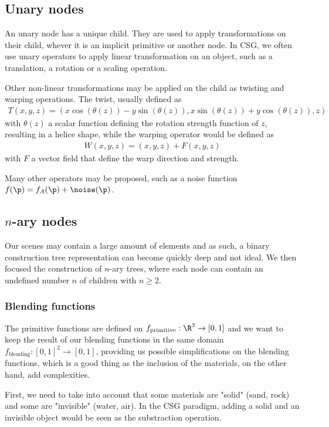 \subsection{Unary nodes}
An unary node has a unique child. They are used to apply transformations on their child, whever it is an implicit primitive or another node. In CSG, we often use unary operators to apply linear transformation on an object, such as a translation, a rotation or a scaling operation. 

Other non-linear transformations may be applied on the child as twisting and warping operations. The twist, usually defined as 
\begin{align}
    T(x, y, z) = \left( x \cos(\theta(z)) - y \sin(\theta(z)), x \sin(\theta(z)) + y \cos(\theta(z)), z \right)
\end{align}
with $\theta(z)$ a scalar function defining the rotation strength function of $z$, resulting in a helice shape, while the warping operator would be defined as 
\begin{align}
    W(x,y,z) = (x,y,z) + F(x, y, z)
\end{align}
with $F$ a vector field that define the warp direction and strength.
    

Many other operators may be proposed, such as a noise function $f(\p) = f_A(\p) + \noise(\p)$.

\subsection{$n$-ary nodes}
Our scenes may contain a large amount of elements and as such, a binary construction tree representation can become quickly deep and not ideal. We then focused the construction of $n$-ary trees, where each node can contain an undefined number $n$ of children with $n \geq 2$.

\subsubsection{Blending functions}
The primitive functions are defined on $f_{\text{primitive}}: \R^3 \to [0,1]$ and we want to keep the result of our blending functions in the same domain $f_{\text{blending}}: [0,1]^2 \to [0,1]$, providing us possible simplifications on the blending functions, which is a good thing as the inclusion of the materials, on the other hand, add complexities.

First, we need to take into account that some materials are "solid" (sand, rock) and some are "invisible" (water, air). In the CSG paradigm, adding a solid and an invisible object would be seen as the substraction operation. 

